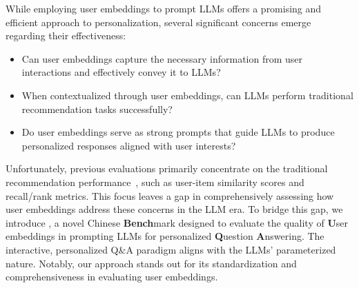 
While employing user embeddings to prompt LLMs offers a promising and efficient approach to personalization, several significant concerns emerge regarding their effectiveness: 
\begin{itemize}[leftmargin=*]
\item Can user embeddings capture the necessary information from user interactions and effectively convey it to LLMs? 
\item When contextualized through user embeddings, can LLMs perform traditional recommendation tasks successfully?
\item Do user embeddings serve as strong prompts that guide LLMs to produce personalized responses aligned with user interests?
\end{itemize}
Unfortunately, previous evaluations primarily concentrate on the traditional recommendation performance~\cite{fang2020deep,hidasi2015session,kang2018self}, such as user-item similarity scores and recall/rank metrics.
This focus leaves a gap in comprehensively assessing how user embeddings address these concerns in the LLM era.
To bridge this gap, we introduce \textbf{\name}, a novel Chinese \textbf{Bench}mark designed to evaluate the quality of \textbf{U}ser embeddings in prompting LLMs for personalized \textbf{Q}uestion \textbf{A}nswering. The interactive, personalized Q\&A paradigm aligns with the LLMs' parameterized nature. 
Notably, our approach stands out for its standardization and comprehensiveness in evaluating user embeddings.


